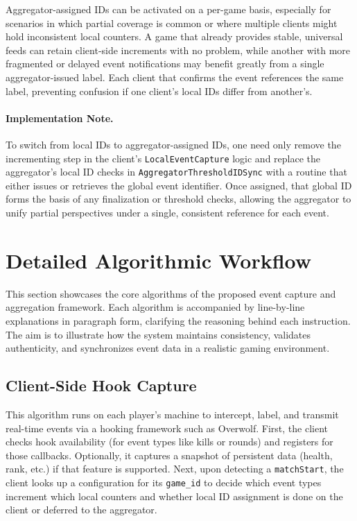 \documentclass[11pt]{article}
\begin{document}
Aggregator-assigned IDs can be activated on a per-game basis, especially for scenarios in which partial coverage is common or where multiple clients might hold inconsistent local counters. A game that already provides stable, universal feeds can retain client-side increments with no problem, while another with more fragmented or delayed event notifications may benefit greatly from a single aggregator-issued label. Each client that confirms the event references the same label, preventing confusion if one client’s local IDs differ from another’s.

\paragraph{Implementation Note.}
To switch from local IDs to aggregator-assigned IDs, one need only remove the incrementing step in the client’s \texttt{LocalEventCapture} logic and replace the aggregator’s local ID checks in \texttt{AggregatorThresholdIDSync} with a routine that either issues or retrieves the global event identifier. Once assigned, that global ID forms the basis of any finalization or threshold checks, allowing the aggregator to unify partial perspectives under a single, consistent reference for each event.


\section{Detailed Algorithmic Workflow}
\label{sec:algorithmicWorkflow}
This section showcases the core algorithms of the proposed event capture and aggregation framework. Each algorithm is accompanied by line-by-line explanations in paragraph form, clarifying the reasoning behind each instruction. The aim is to illustrate how the system maintains consistency, validates authenticity, and synchronizes event data in a realistic gaming environment.

\subsection{Client-Side Hook Capture}
\label{sec:clientHookSubsec}

This algorithm runs on each player's machine to intercept, label, and transmit real-time events via a hooking framework such as Overwolf. First, the client checks hook availability (for event types like kills or rounds) and registers for those callbacks. Optionally, it captures a snapshot of persistent data (health, rank, etc.) if that feature is supported. Next, upon detecting a \texttt{matchStart}, the client looks up a configuration for its \texttt{game\_id} to decide which event types increment which local counters and whether local ID assignment is done on the client or deferred to the aggregator. 
\end{document}
